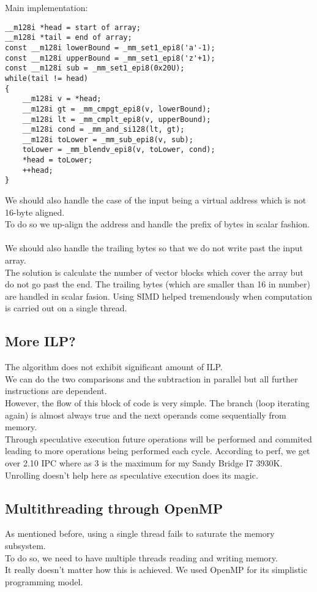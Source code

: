 \documentclass[10pt, fleqn]{article}
\begin{document}
Main implementation:\\
\begin{lstlisting}
__m128i *head = start of array;
__m128i *tail = end of array;
const __m128i lowerBound = _mm_set1_epi8('a'-1);
const __m128i upperBound = _mm_set1_epi8('z'+1);
const __m128i sub = _mm_set1_epi8(0x20U);
while(tail != head)
{
    __m128i v = *head;
    __m128i gt = _mm_cmpgt_epi8(v, lowerBound);
    __m128i lt = _mm_cmplt_epi8(v, upperBound);
    __m128i cond = _mm_and_si128(lt, gt);
    __m128i toLower = _mm_sub_epi8(v, sub);
    toLower = _mm_blendv_epi8(v, toLower, cond);
    *head = toLower;
    ++head;
}
\end{lstlisting}

We should also handle the case of the input being a virtual address which is not 16-byte aligned.\\
To do so we up-align the address and handle the prefix of bytes in scalar fashion.\\\\
We should also handle the trailing bytes so that we do not write past the input array.\\
The solution is calculate the number of vector blocks which cover the array but do not go past the end. The trailing bytes (which are smaller than 16 in number) are handled in scalar fasion.
Using SIMD helped tremendously when computation is carried out on a single thread.

\subsection{More ILP?}
The algorithm does not exhibit significant amount of ILP.\\
We can do the two comparisons and the subtraction in parallel but all further instructions are dependent.\\
However, the flow of this block of code is very simple. The branch (loop iterating again) is almost always true and the next operands come sequentially from memory.\\
Through speculative execution future operations will be performed and commited leading to more operations being performed each cycle. According to perf, we get over 2.10 IPC where as 3 is the maximum for my Sandy Bridge I7 3930K.
Unrolling doesn't help here as speculative execution does its magic.

\subsection{Multithreading through OpenMP}
As mentioned before, using a single thread fails to saturate the memory subsystem.\\
To do so, we need to have multiple threads reading and writing memory.\\
It really doesn't matter how this is achieved. We used OpenMP for its simplistic programming model.
\end{document}
